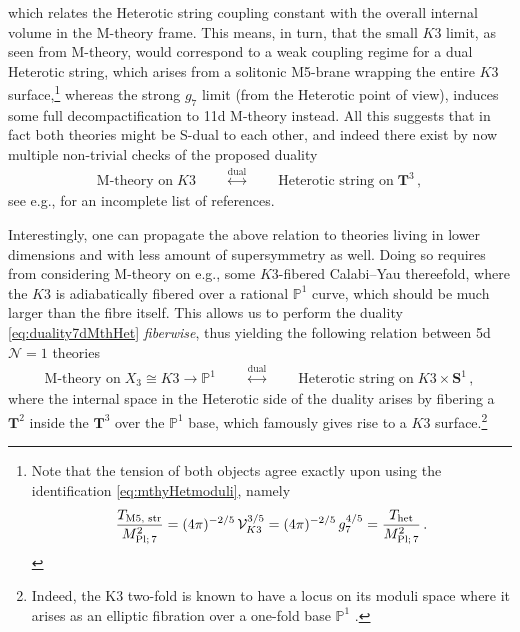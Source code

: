 %
which relates the Heterotic string coupling constant with the overall internal volume in the M-theory frame. This means, in turn, that the small $K3$ limit, as seen from M-theory, would correspond to a weak coupling regime for a dual Heterotic string, which arises from a solitonic M5-brane wrapping the entire $K3$ surface,\footnote{Note that the tension of both objects agree exactly upon using the identification \eqref{eq:mthyHetmoduli}, namely
\begin{align}
 \notag \frac{T_{\text{M5, str}}}{M_{\text{Pl};\, 7}^2} = (4\pi)^{-2/5}\, \mathcal{V}_{K3}^{3/5} = (4\pi)^{-2/5}\,  g_7^{4/5} = \frac{T_{\text{het}}}{M_{\text{Pl};\, 7}^2}\, . 
\end{align}} whereas the strong $g_7$ limit (from the Heterotic point of view), induces some full decompactification to 11d M-theory instead. All this suggests that in fact both theories might be S-dual to each other, and indeed there exist by now multiple non-trivial checks of the proposed duality
%
\begin{align}\label{eq:duality7dMthHet}
\text{M-theory on}\; K3 \qquad \stackrel{\text{dual}}{\longleftrightarrow} \qquad \text{Heterotic string on}\; \mathbf{T}^3\, , 
\end{align}
%
see e.g., \cite{Witten:1995ex,Cherkis:1997bx,Park_2009} for an incomplete list of references.

Interestingly, one can propagate the above relation to theories living in lower dimensions and with less amount of supersymmetry as well. Doing so requires from considering M-theory on e.g., some $K3$-fibered Calabi--Yau thereefold, where the $K3$ is adiabatically fibered over a rational $\mathbb{P}^1$ curve, which should be much larger than the fibre itself. This allows us to perform the duality \eqref{eq:duality7dMthHet} \emph{fiberwise}, thus yielding the following relation between 5d $\mathcal{N}=1$ theories
%
\begin{align}\label{eq:duality5dMthHet}
\text{M-theory on}\; X_3 \cong K3\rightarrow \mathbb{P}^1 \qquad \stackrel{\text{dual}}{\longleftrightarrow} \qquad \text{Heterotic string on}\; K3 \times \mathbf{S}^1\, , 
\end{align}
%
where the internal space in the Heterotic side of the duality arises by fibering a $\mathbf{T}^2$ inside the $\mathbf{T}^3$ over the $\mathbb{P}^1$ base, which famously gives rise to a $K3$ surface.\footnote{Indeed, the K3 two-fold is known to have a locus on its moduli space where it arises as an elliptic fibration over a one-fold base $\mathbb{P}^1$ \cite{Weigand:2010wm}.}

